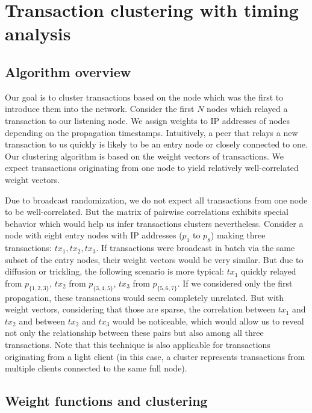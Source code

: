 \section{Transaction clustering with timing analysis}  \label{sec:Ch03Ourapproach}

\subsection{Algorithm overview}

Our goal is to cluster transactions based on the node which was the first to introduce them into the network.
Consider the first $N$ nodes which relayed a transaction to our listening node.
We assign weights to IP addresses of nodes depending on the propagation timestamps.
Intuitively, a peer that relays a new transaction to us quickly is likely to be an entry node or closely connected to one.
Our clustering algorithm is based on the weight vectors of transactions.
We expect transactions originating from one node to yield relatively well-correlated weight vectors.

Due to broadcast randomization, we do not expect all transactions from one node to be well-correlated.
But the matrix of pairwise correlations exhibits special behavior which would help us infer transactions clusters nevertheless.
Consider a node with eight entry nodes with IP addresses ($p_1$ to $p_8$) making three transactions: $tx_1, tx_2, tx_3$.
If transactions were broadcast in batch via the same subset of the entry nodes, their weight vectors would be very similar.
But due to diffusion or trickling, the following scenario is more typical: $tx_1$ quickly relayed from $p_{\{1,2,3\}}$, $tx_2$ from $p_{\{3,4,5\}}$, $tx_3$ from $p_{\{5,6,7\}}$.
If we considered only the first propagation, these transactions would seem completely unrelated.
But with weight vectors, considering that those are sparse, the correlation between $tx_1$ and $tx_2$ and between $tx_2$ and $tx_3$ would be noticeable, which would allow us to reveal not only the relationship between these pairs but also among all three transactions.
Note that this technique is also applicable for transactions originating from a light client (in this case, a cluster represents transactions from multiple clients connected to the same full node).

\subsection{Weight functions and clustering}

